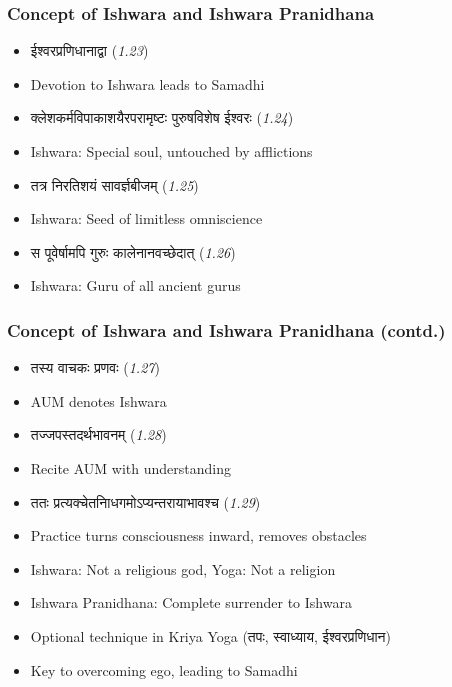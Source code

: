 \begin{frame}[fragile]\frametitle{Concept of Ishwara and Ishwara Pranidhana}
    \begin{itemize}
        \item ईश्वरप्रणिधानाद्वा (\textit{1.23})
        \item Devotion to Ishwara leads to Samadhi
        \item क्लेशकर्मविपाकाशयैरपरामृष्टः पुरुषविशेष ईश्वरः (\textit{1.24})
        \item Ishwara: Special soul, untouched by afflictions
        \item तत्र निरतिशयं सावर्ज्ञबीजम् (\textit{1.25})
        \item Ishwara: Seed of limitless omniscience
        \item स पूवेर्षामपि गुरुः कालेनानवच्छेदात् (\textit{1.26})
        \item Ishwara: Guru of all ancient gurus
    \end{itemize}
\end{frame}

\begin{frame}[fragile]\frametitle{Concept of Ishwara and Ishwara Pranidhana (contd.)}
    \begin{itemize}
        \item तस्य वाचकः प्रणवः (\textit{1.27})
        \item AUM denotes Ishwara
        \item तज्जपस्तदर्थभावनम् (\textit{1.28})
        \item Recite AUM with understanding
        \item ततः प्रत्यक्चेतनािधगमोऽप्यन्तरायाभावश्च (\textit{1.29})
        \item Practice turns consciousness inward, removes obstacles
        \item Ishwara: Not a religious god, Yoga: Not a religion
        \item Ishwara Pranidhana: Complete surrender to Ishwara
        \item Optional technique in Kriya Yoga (तपः, स्वाध्याय, ईश्वरप्रणिधान)
        \item Key to overcoming ego, leading to Samadhi
    \end{itemize}
\end{frame}


